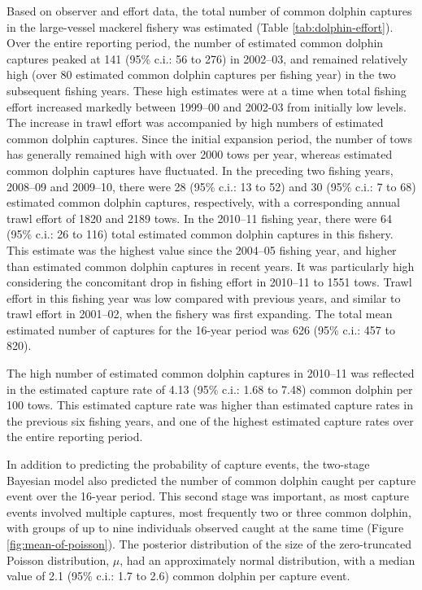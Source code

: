 \documentclass[10pt]{article}
\begin{document}
Based on observer and effort data, the total number of common dolphin
captures in the large-vessel mackerel fishery was estimated (Table
\ref{tab:dolphin-effort}). Over the entire reporting period, the
number of estimated common dolphin captures peaked at 141 (95\% c.i.:
56 to 276) in \mbox{2002--03}, and remained relatively high (over 80
estimated common dolphin captures per fishing year) in the two
subsequent fishing years.  These high estimates were at a time when
total fishing effort increased markedly between \mbox{1999--00} and
\mbox{2002-03} from initially low levels. The increase in trawl effort
was accompanied by high numbers of estimated common dolphin captures.
Since the initial expansion period, the number of tows has generally
remained high with over 2000 tows per year, whereas estimated common dolphin captures have fluctuated.  In the preceding two fishing years, \mbox{2008--09} and \mbox{2009--10}, there were 28 (95\% c.i.: 13 to 52) and 30 (95\% c.i.: 7 to 68) estimated common dolphin captures, respectively, with a corresponding annual trawl effort of 1820 and 2189 tows.  In the \mbox{2010--11} fishing year, there were 64 (95\% c.i.: 26 to 116) total estimated common dolphin captures in this fishery.  This estimate was the highest value since the \mbox{2004--05} fishing year, and higher than estimated common dolphin captures in recent years.  It was particularly high considering the concomitant drop in fishing effort in \mbox{2010--11}  to 1551 tows.  Trawl effort in this fishing year was low compared with previous years, and similar to trawl effort in \mbox{2001--02}, when the fishery was first expanding. The total mean estimated number of captures for the 16-year period was 626 (95\% c.i.: 457 to 820).

The high number of estimated common dolphin captures in \mbox{2010--11} was reflected in the estimated capture rate of 4.13 (95\% c.i.: 1.68 to 7.48) common dolphin per 100 tows.  This estimated capture rate was higher than estimated capture rates in the previous six fishing years, and one of the highest estimated capture rates over the entire reporting period.

In addition to predicting the probability of capture events, the two-stage Bayesian model also predicted the number of common dolphin caught per capture event over the 16-year period.  This second stage was important, as most capture events involved multiple captures, most frequently two or three common dolphin, with groups of up to nine individuals observed caught at the same time (Figure \ref{fig:mean-of-poisson}). The posterior distribution of the size of the zero-truncated Poisson distribution, $\mu$, had an approximately normal distribution, with a median value of 2.1 (95\% c.i.: 1.7 to 2.6) common dolphin per capture event.
\end{document}
